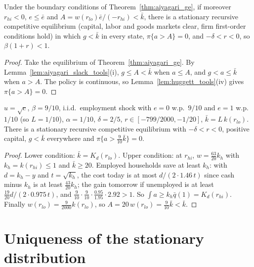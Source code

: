 \begin{theorem}
\label{thm:aiyagari_slack}
\leanok
{}
Under the boundary conditions of Theorem~\ref{thm:aiyagari_ge}, if moreover $r_{hi}<0$, $e\le\bar e$ and
$A = w(r_{lo})\bar e/(-r_{hi}) < \bar k$, there is a stationary recursive competitive equilibrium (capital, labor
and goods markets clear, firm first-order conditions hold) in which $g<\bar k$ in every state, $\pi\{a>A\}=0$, and
$-\delta<r<0$, so $\beta(1+r)<1$.
\end{theorem}
\begin{proof}
\leanok
Take the equilibrium of Theorem~\ref{thm:aiyagari_ge}. By Lemma~\ref{lem:aiyagari_slack_tools}(i), $g\le A<\bar k$
when $a\le A$, and $g<a\le\bar k$ when $a>A$. The policy is continuous, so Lemma~\ref{lem:huggett_tools}(iv)
gives $\pi\{a>A\}=0$.
\end{proof}

\begin{theorem}
\label{thm:aiyagari_slack_example}
\leanok
{}
$u=\sqrt c$, $\beta=9/10$, i.i.d.\ employment shock with $e=0$ w.p.\ $9/10$ and $e=1$ w.p.\ $1/10$ (so $L=1/10$),
$\alpha=1/10$, $\delta=2/5$, $r\in[-799/2000,-1/20]$, $\bar k = L\,k(r_{lo})$. There is a stationary recursive
competitive equilibrium with $-\delta<r<0$, positive capital, $g<\bar k$ everywhere and $\pi\{a>\tfrac9{10}\bar k\}=0$.
\end{theorem}
\begin{proof}
\leanok
{}
Lower condition: $\bar k = K_d(r_{lo})$. Upper condition: at $r_{hi}$, $w = \tfrac{63}{20}k_h$ with $k_h = k(r_{hi})\le 1$
and $\bar k\ge 20$. Employed households save at least $k_h$: with $d = k_h - y$ and $t = \sqrt{k_h}$, the cost today
is at most $d/(2\cdot1.46\,t)$ since cash minus $k_h$ is at least $\tfrac{43}{20}k_h$; the gain tomorrow if
unemployed is at least $\tfrac{19}{20}d/(2\cdot0.975\,t)$, and $\tfrac9{10}\cdot\tfrac9{10}\cdot\tfrac{0.95}{1.95}\cdot
2.92>1$. So $\int a\ge k_h\bar q(1) = K_d(r_{hi})$. Finally $w(r_{lo}) = \tfrac{9}{2000}k(r_{lo})$, so
$A = 20\,w(r_{lo}) = \tfrac9{10}\bar k<\bar k$.
\end{proof}

\section{Uniqueness of the stationary distribution}
\label{sec:stationary_unique}

